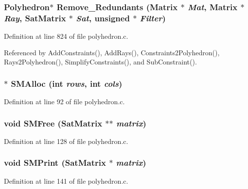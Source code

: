 \subsubsection{\setlength{\rightskip}{0pt plus 5cm}Polyhedron$\ast$ Remove\_\-Redundants (Matrix $\ast$ {\em Mat}, Matrix $\ast$ {\em Ray}, {\bf Sat\-Matrix} $\ast$ {\em Sat}, unsigned $\ast$ {\em Filter})\hspace{0.3cm}{\tt  [static]}}\label{polyhedron_8c_a16}




Definition at line 824 of file polyhedron.c.

Referenced by Add\-Constraints(), Add\-Rays(), Constraints2Polyhedron(), Rays2Polyhedron(), Simplify\-Constraints(), and Sub\-Constraint().

\subsubsection{$\ast$ SMAlloc (int {\em rows}, int {\em cols})\hspace{0.3cm}{\tt  [static]}}\label{polyhedron_8c_a7}




Definition at line 92 of file polyhedron.c.
\subsubsection{\setlength{\rightskip}{0pt plus 5cm}void SMFree ({\bf Sat\-Matrix} $\ast$$\ast$ {\em matrix})\hspace{0.3cm}{\tt  [static]}}\label{polyhedron_8c_a8}




Definition at line 128 of file polyhedron.c.
\subsubsection{\setlength{\rightskip}{0pt plus 5cm}void SMPrint ({\bf Sat\-Matrix} $\ast$ {\em matrix})\hspace{0.3cm}{\tt  [static]}}\label{polyhedron_8c_a9}




Definition at line 141 of file polyhedron.c.

